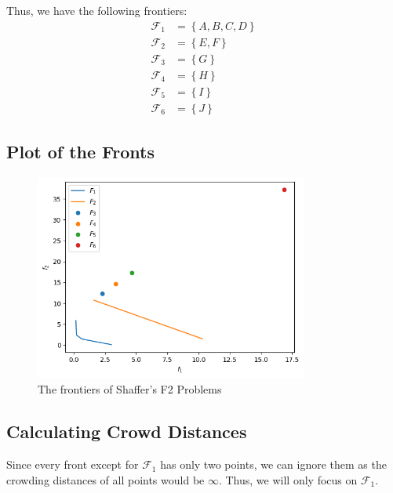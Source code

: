 Thus, we have the following frontiers:
\[
\begin{aligned}
    \mathcal{F}_1 &= \left\{A, B, C, D\right\} \\
    \mathcal{F}_2 &= \left\{E, F\right\} \\
    \mathcal{F}_3 &= \left\{G\right\} \\
    \mathcal{F}_4 &= \left\{H\right\} \\
    \mathcal{F}_5 &= \left\{I\right\} \\
    \mathcal{F}_6 &= \left\{J\right\}
\end{aligned}
\]

\newpage

\subsection{Plot of the Fronts}

\begin{figure}[ht]
    \centering
    \includegraphics[width=0.8\textwidth]{images/p2-pareto_front.png}
    \caption{The frontiers of Shaffer's F2 Problems}
\end{figure}

\subsection{Calculating Crowd Distances}

Since every front except for \(\mathcal{F}_1\) has only two points, we can ignore them as the crowding distances of all points would be \(\infty\). Thus, we will only focus on \(\mathcal{F}_1\).

